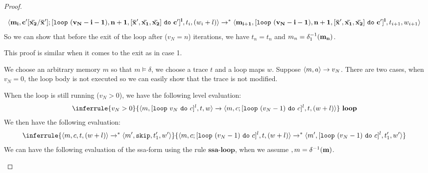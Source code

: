 \documentclass[a4paper,11pt]{article}
\begin{document}
\begin{proof}
\begin{itemize}
{\begin{enumerate}
\[{  }{
  \langle \mathbf{{ {m_i}, c'[ \bar{x_2}/\bar{x}'  ];  [\mathtt{loop} ~ (v_N-i-1), n+1, [\bar{\mathbf{{x}}}', \bar{\mathbf{{x_1}}}, \bar{\mathbf{{x_2}}}] ~  \mathtt{do} ~ c' ]^{l} }},  t_i, (w_i + l)   \rangle  \to^{*} \\ \langle  \mathbf{{{m_{i+1}}, [\mathtt{loop} ~ (v_N-i-1), n+1, [\bar{\mathbf{{x}}}', \bar{\mathbf{{x_1}}}, \bar{\mathbf{{x_2}}}] ~  \mathtt{do} ~ c' ]^{l}}}, t_{i+1}, w_{i+1}   \rangle 
  }
\]
So we can show that before the exit of the loop after ($v_N= n $) iterations, we have $t_{n} = t_{n}$ and $m_{n} = \delta_1^{-1}(\mathbf{{m_{n}}})$.
 \end{enumerate}
%
This proof is similar when it comes to the exit as in case 1. 
}
%
We choose an arbitrary memory $m$ so that $m \vDash \delta$, we choose a trace $t$ and a loop maps $w$. Suppose $ \langle m ,a \rangle \to v_N $. There are two cases, when $v_N=0$, the loop body is not executed so we can easily show that the trace is not modified.

 When the loop is still running ($v_N > 0$), we have the following level evaluation:
\[
{\inferrule
{
 \valr_N > 0
}
{
\config{m, [\eloop ~ \valr_N  ~ \edo ~ c]^{l} ,  t, w }
\xrightarrow{} \config{m, c ;  [\eloop ~ (\valr_N-1) ~ \edo ~ c ]^{l},  t, (w + l) }
}
~\textbf{loop}
}
\]
We then have the following evaluation:
\[
 \inferrule{
 \config{m, c , t, (w + l)  } \to^{*} \config{m', \eskip , t'_{1}, w'   }
 }{
 \config{m, c ;  [\eloop ~ (\valr_N-1) ~ \edo ~ c ]^{l},  t, (w + l) } 
 \to^{*} \config{m',   [\eloop ~ (\valr_N-1) ~ \edo ~ c ]^{l},  t'_{1}, w'  } 
  }
\]
 We can have the following evaluation of the ssa-form using the rule $\textbf{ssa-loop}$, when we assume  $ ,m = \delta^{-1}(\mathbf{{m}})$.


\end{itemize}
\end{proof}
\end{document}
